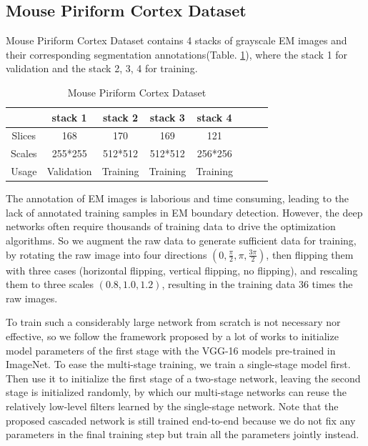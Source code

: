 \documentclass[senior]{IPSstyle}
\begin{document}
\subsection{Mouse Piriform Cortex Dataset}\label{experiment of piriform}

Mouse Piriform Cortex Dataset\cite{Lee2015} contains 4 stacks of grayscale EM images and their corresponding segmentation annotations(Table. \ref{piriform_dataset}), where the stack 1 for validation and the stack 2, 3, 4 for training. 

\begin{table}[t]
\renewcommand{\arraystretch}{1.2}
\caption{Mouse Piriform Cortex Dataset}
\label{piriform_dataset}
\begin{center}
\begin{tabular}{|c|c|c|c|c|c|c|c|}
\hline
\multicolumn{1}{|c|}{}
&\multicolumn{1}{c|}{stack 1}
&\multicolumn{1}{c|}{stack 2}
&\multicolumn{1}{c|}{stack 3}
&\multicolumn{1}{c|}{stack 4}
\\
\hline
Slices	&	168	&	170		&	169		&	121		\\	\hline
Scales	&	255*255	&	512*512		&	512*512		&	256*256		\\	\hline
Usage	&	Validation	&	Training		&	Training		&	Training		\\	\hline
\end{tabular}
\end{center}
\end{table}

The annotation of EM images is laborious and time consuming\cite{Helmstaedter2013}, leading to the lack of annotated training samples in EM boundary detection. However, the deep networks often require thousands of training data to drive the optimization algorithms. So we augment the raw data to generate sufficient data for training, by rotating the raw image into four directions \((0, \frac{\pi}{2}, \pi, \frac{3\pi}{2})\), then flipping them with three cases (horizontal flipping, vertical flipping, no flipping), and rescaling them to three scales \((0.8, 1.0, 1.2)\), resulting in the training data 36 times the raw images.

To train such a considerably large network from scratch is not necessary nor effective, so we follow the framework proposed by a lot of works\cite{Long2015, Xie2015, Shen2016CVPR} to initialize model parameters of the first stage with the VGG-16 models pre-trained in ImageNet\cite{Deng2009}. To ease the multi-stage training, we train a single-stage model first. Then use it to initialize the first stage of a two-stage network, leaving the second stage is initialized randomly, by which our multi-stage networks can reuse the relatively low-level filters learned by the single-stage network. Note that the proposed cascaded network is still trained end-to-end because we do not fix any parameters in the final training step but train all the parameters jointly instead. 
\end{document}

